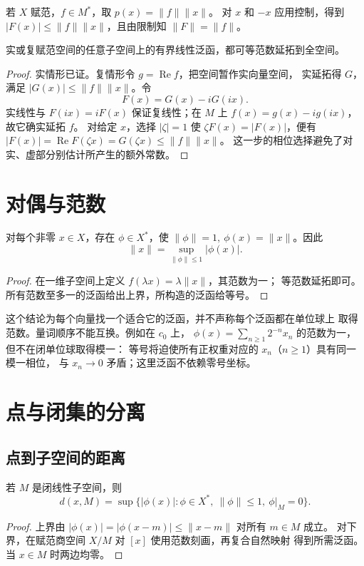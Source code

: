 若 \(X\) 赋范，\(f\in M^*\)，取 \(p(x)=\|f\|\|x\|\)。
对 \(x\) 和 \(-x\) 应用控制，得到 \(|F(x)|\le\|f\|\|x\|\)，且由限制知
\(\|F\|=\|f\|\)。

\begin{theorem}\label{thm:hahn-banach-norm}
实或复赋范空间的任意子空间上的有界线性泛函，都可等范数延拓到全空间。
\end{theorem}
\begin{proof}
实情形已证。复情形令 \(g=\operatorname{Re}f\)，把空间暂作实向量空间，
实延拓得 \(G\)，满足 \(|G(x)|\le\|f\|\|x\|\)。令
\[
 F(x)=G(x)-iG(ix).
\]
实线性与 \(F(ix)=iF(x)\) 保证复线性；在 \(M\) 上
\(f(x)=g(x)-ig(ix)\)，故它确实延拓 \(f\)。
对给定 \(x\)，选择 \(|\zeta|=1\) 使 \(\zeta F(x)=|F(x)|\)，便有
\(|F(x)|=\operatorname{Re}F(\zeta x)=G(\zeta x)\le\|f\|\|x\|\)。
这一步的相位选择避免了对实、虚部分别估计所产生的额外常数。
\end{proof}

\section{对偶与范数}

\begin{corollary}\label{cor:dual-norming}
对每个非零 \(x\in X\)，存在 \(\phi\in X^*\)，使
\(\|\phi\|=1,\ \phi(x)=\|x\|\)。因此
\[
 \|x\|=\sup_{\|\phi\|\le1}|\phi(x)|.
\]
\end{corollary}
\begin{proof}
在一维子空间上定义 \(f(\lambda x)=\lambda\|x\|\)，其范数为一；
等范数延拓即可。所有范数至多一的泛函给出上界，所构造的泛函给等号。
\end{proof}

这个结论为每个向量找一个适合它的泛函，并不声称每个泛函都在单位球上
取得范数。量词顺序不能互换。例如在 \(c_0\) 上，
\(\phi(x)=\sum_{n\ge1}2^{-n}x_n\) 的范数为一，但不在闭单位球取得模一：
等号将迫使所有正权重对应的 \(x_n\)（\(n\ge1\)）具有同一模一相位，
与 \(x_n\to0\) 矛盾；这里泛函不依赖零号坐标。

\section{点与闭集的分离}

\subsection{点到子空间的距离}

\begin{proposition}\label{prop:subspace-distance-dual}
若 \(M\) 是闭线性子空间，则
\[
 d(x,M)=\sup\{|\phi(x)|:\phi\in X^*,\ \|\phi\|\le1,\ \phi|_M=0\}.
\]
\end{proposition}
\begin{proof}
上界由 \(|\phi(x)|=|\phi(x-m)|\le\|x-m\|\) 对所有 \(m\in M\) 成立。
对下界，在赋范商空间 \(X/M\) 对 \([x]\) 使用范数刻画，再复合自然映射
得到所需泛函。当 \(x\in M\) 时两边均零。
\end{proof}

